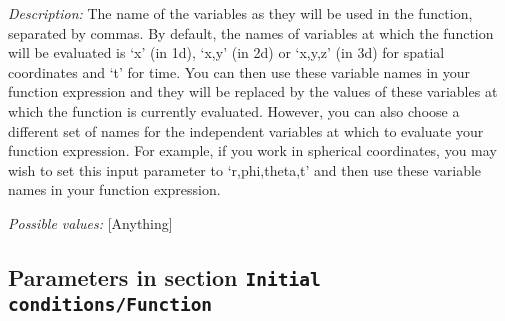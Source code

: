 \begin{itemize}
{\it Description:} The name of the variables as they will be used in the function, separated by commas. By default, the names of variables at which the function will be evaluated is `x' (in 1d), `x,y' (in 2d) or `x,y,z' (in 3d) for spatial coordinates and `t' for time. You can then use these variable names in your function expression and they will be replaced by the values of these variables at which the function is currently evaluated. However, you can also choose a different set of names for the independent variables at which to evaluate your function expression. For example, if you work in spherical coordinates, you may wish to set this input parameter to `r,phi,theta,t' and then use these variable names in your function expression.


{\it Possible values:} [Anything]
\end{itemize}

\subsection{Parameters in section \tt Initial conditions/Function}
\label{parameters:Initial_20conditions/Function}

